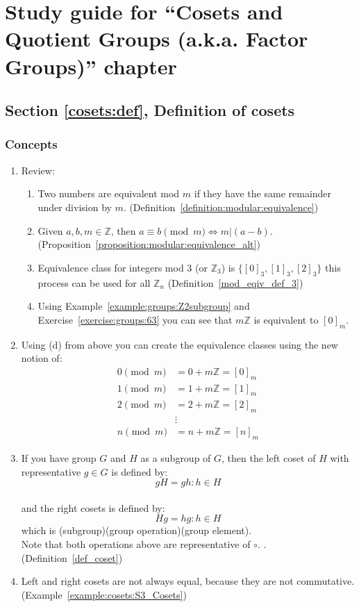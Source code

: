 \section{Study guide  for ``Cosets and Quotient Groups (a.k.a. Factor Groups)''  chapter}
\label{sec:cosets:study} 


\subsection*{Section \ref{cosets:def}, Definition of cosets}
\subsubsection*{Concepts}
\begin{enumerate}
\item 
Review:
	\begin{enumerate}
	\item
	Two numbers are equivalent mod $m$ if they have the same remainder under division by $m$. (Definition~\ref{definition:modular:equivalence})
	\item
	Given $a, b, m \in {\mathbb Z}$, then $a \equiv b \pmod{m} \iff m | (a - b)$. (Proposition~\ref{proposition:modular:equivalence_alt})
	\item
	Equivalence class for integers mod 3 (or ${\mathbb Z}_3$) is $\{ [0]_3, [1]_3, [2]_3 \}$ this process can be used for all ${\mathbb Z}_n$ (Definition~\ref{mod_eqiv_def_3})
	\item
	Using Example~\ref{example:groups:Z2subgroup} and Exercise~\ref{exercise:groups:63} you can see that $m{\mathbb Z}$ is equivalent to  $[0]_m$.
	\end{enumerate}
	
\item
Using (d) from above you can create the equivalence classes using the new notion of:
	\begin{align*}
	0 \pmod{m} &= 0 + m{\mathbb Z} = [0]_m
	\\
	1 \pmod{m} &= 1 + m{\mathbb Z} = [1]_m
	\\
	2 \pmod{m} &= 2 + m{\mathbb Z} =  [2]_m
	\\
	&\vdots
	\\
	n \pmod{m} &= n + m{\mathbb Z} =  [n]_m
	\end{align*}

\item
If you have group $G$ and $H$ as a subgroup of $G$, then the left coset of $H$ with representative $g \in G$ is defined by:
\\
$$gH = {gh:h \in H}$$
\\
and the right cosets is defined by:
\\
$$Hg = {hg:h \in H}$$
which is (subgroup)(group operation)(group element).
\\
Note that both operations above are representative of $\circ$. . (Definition~\ref{def_coset})

\item
Left and right cosets are not always equal, because they are not commutative. (Example~\ref{example:cosets:S3_Cosets})
\end{enumerate}

